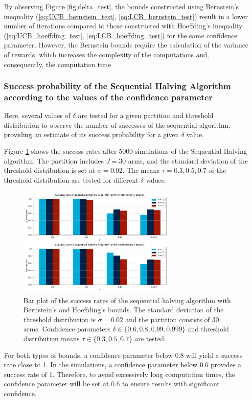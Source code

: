 \documentclass{statsmsc}
\begin{document}
By observing Figure \ref{fig:delta_test}, the bounds constructed using Bernstein's inequality (\ref{eq:UCB_bernstein_test}, \ref{eq:LCB_bernstein_test}) result in a lower number of iterations compared to those constructed with Hoeffding's inequality (\ref{eq:UCB_hoeffding_test}, \ref{eq:LCB_hoeffding_test}) for the same confidence parameter. However, the Bernstein bounds require the calculation of the variance of rewards, which increases the complexity of the computations and, consequently, the computation time

\subsubsection{Success probability of the Sequential Halving Algorithm according to the values of the confidence parameter}

Here, several values of $\delta$ are tested for a given partition and threshold distribution to observe the number of successes of the sequential algorithm, providing an estimate of its success probability for a given $\delta$ value.

Figure \ref{fig:succes_rate} shows the success rates after 5000 simulations of the Sequential Halving algorithm. The partition includes $J = 30$ arms, and the standard deviation of the threshold distribution is set at $\sigma = 0.02$. The means $\tau = 0.3, 0.5, 0.7$ of the threshold distribution are tested for different $\delta$ values.

\begin{figure}[htbp]
  \centering
  \includegraphics[width= 0.7\textwidth]{images/delta_test.pdf}
  \caption{Bar plot of the success rates of the sequential halving algorithm with Bernstein's and Hoeffding's bounds. The standard deviation of the threshold distribution 
  is $\sigma = 0.02$ and the partition consists of 30 arms. Confidence parameters $\delta \in \{0.6, 0.8, 0.99, 0.999\}$ and threshold distribution means $\tau \in \{0.3, 0.5, 0.7\}$ are tested.}
  \label{fig:succes_rate}
\end{figure}
For both types of bounds, a confidence parameter below $0.8$ will yield a success rate close to 1. In the simulations, a confidence parameter below $0.6$ provides a success rate of 1. Therefore, to avoid excessively long computation times, the confidence parameter will be set at $0.6$ to ensure results with significant confidence.
\end{document}
